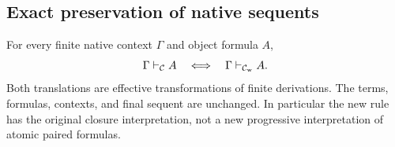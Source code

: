 \subsection{Exact preservation of native sequents}

\begin{theorem}
\label{thm:det-witness-equivalence}
For every finite native context $\Gamma$ and object formula $A$,
\[
 \Gamma\vdash_{\mathcal C} A
 \quad\Longleftrightarrow\quad
 \Gamma\vdash_{\mathcal C_{\rm w}} A.
\]
Both translations are effective transformations of finite derivations.
The terms, formulas, contexts, and final sequent are unchanged.  In
particular the new rule has the original closure interpretation, not a
new progressive interpretation of atomic paired formulas.
\end{theorem}
